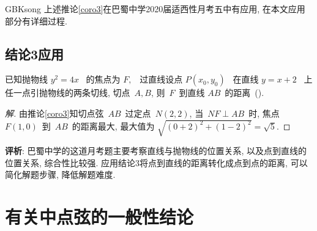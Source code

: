 \documentclass[a4paper, 12pt, twoside]{ctexart}
\begin{document}
\begin{CJK*}{GBK}{song}
        上述推论\ref{coro3}在巴蜀中学2020届适西性月考五中有应用, 在本文应用部分有详细过程.
\subsection{结论3应用}
    \begin{exa}
        已知抛物线 $y^2=4 x$~ 的焦点为 $F, $~ 过直线设点 $P(x_0, y_0)$~ 在直线 $y=x+2$~ 上任一点引抛物线的两条切线, 切点~$A,B$, 则~$F$~到直线 $AB$~的距离~\hfill(\quad).
    \end{exa}
    \begin{proof}[解]
        由推论\ref{coro3}知切点弦~$AB$~过定点~$N(2,2)$, 当~$NF\perp AB$~时, 焦点 $F(1, 0)$~到~$AB$~的距离最大, 最大值为 $\sqrt{(0+2)^{2}+(1-2)^{2}}=\sqrt{5}$.
    \end{proof}

    \textbf{评析}: 巴蜀中学的这道月考题主要考察直线与抛物线的位置关系,  以及点到直线的位置关系,  综合性比较强. 应用结论3将点到直线的距离转化成点到点的距离, 可以简化解题步骤,  降低解题难度.
\section{有关中点弦的一般性结论}

\end{CJK*}
\end{document}
